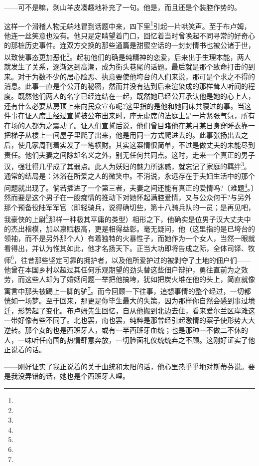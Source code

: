 \par ——可不是嘛，剥山羊皮凑趣地补充了一句。他是，而且还是个装腔作势的。
\par 这样一个滑稽人物无端地冒到话题中来，四下里\footnote{}引起一片哄笑声。至于布卢姆，他连一丝笑意也没有。他只是定睛望着门口，回忆着当时曾唤起不同寻常的好奇心的那桩历史事件。连双方交换的那些通篇是甜蜜空话的一封封情书也被公诸于世，以致使事态更加恶化\footnote{}。起初他们的确是纯精神的恋爱，后来出于生理本能，两人就发生了关系，逐渐达到高潮，成为街头巷尾的话题。最后就是那个致命打击的到来。对于为数不少的居心险恶、执意要使他垮台的人们来说，那可是个求之不得的消息。此事一直是个公开的秘密，然而并没有达到后来渲染成的那样耸人听闻的程度。既然他们两人的名字已经连结在一起，既然她已经公开承认他是她的心上人，还有什么必要从房顶上来向民众宣布呢?这里指的是他和她同床共寝过的事。当这件事在证人席上经过宣誓被公布出来时，座无虚席的法庭上是一片紧张气氛，所有在场的人都为之震动了。证人们宣誓后说，他们曾目睹他在某月某日身穿睡衣靠一把梯子从楼上一间屋子里爬了出来，他是用同一方式爬进去的。此事张扬出去之后，使几家周刊着实发了一笔横财。其实这案情很简单，不过是做丈夫的未能尽到责任。他们夫妻之间除却名义之外，别无任何共同点。这时，走来一个真正的男子汉，强壮得几乎成了其弱点。此人为妖妇的魅力所迷惑，就忘记了家庭的羁绊\footnote{}。通常的结局是：沐浴在所爱之人的微笑中。不消说，永远存在于夫妇生活中的那个问题就出现了。倘若插进了一个第三者，夫妻之间还能有真正的爱情吗?〔难题\footnote{}。〕然而要是这个男子在一股痴情的推动下对她怀起满腔爱情，又与公众何干?与另外那个预备役陆军军官（即轻骑兵，说得确切些，第十八骑兵队的一员；是再见吧，我豪侠的上尉\footnote{}那样一种极其平庸的类型）相形之下，他确实是位男子汉大丈夫中的杰出楷模，加以禀赋极高，更是相得益彰。毫无疑问，他（这里指的是已垮台的领袖，而不是另外那个人）有着独特的火暴性子，而她作为一个女人，当然一眼就看得出，并认为惟其如此，他才名扬天下。正当大功即将告成之际，全体司铎、牧师\footnote{}，往昔那些坚定可靠的拥护者，以及他所爱护过的被剥夺了土地的佃户们——他曾在本国乡村以超过其任何乐观期望的劲头替这些佃户辩护，勇往直前为之效劳，而这些人却为了婚姻问题一举把他搞垮，犹如把炭火堆在他的头上，简直就像寓言中那头被踢上一脚的驴\footnote{}。而今回顾一下往事，追想事情的整个经过，一切都恍如一场梦。至于回来，那更是你毕生最大的失策，因为那样你自然会感到事过境迁，形势起了变化。布卢姆先生回忆，自从他搬到北边去住，看来爱尔兰区岸滩这一带好像有些不同了。北也罢，南也罢，纯粹是那曾经引起激情的案子使形势大大逆转。那个女的也是西班牙人，或有一半西班牙血统；也是那种一不做二不休的人，一味听任南国的热情肆意奔放，一切脸面礼仪统统弃之不顾。这刚好证实了他正说着的话。
\par ——刚好证实了我正说着的关于血统和太阳的话，他心里热乎乎地对斯蒂芬说。要是我没弄错的话，她也是个西班牙人哩。
